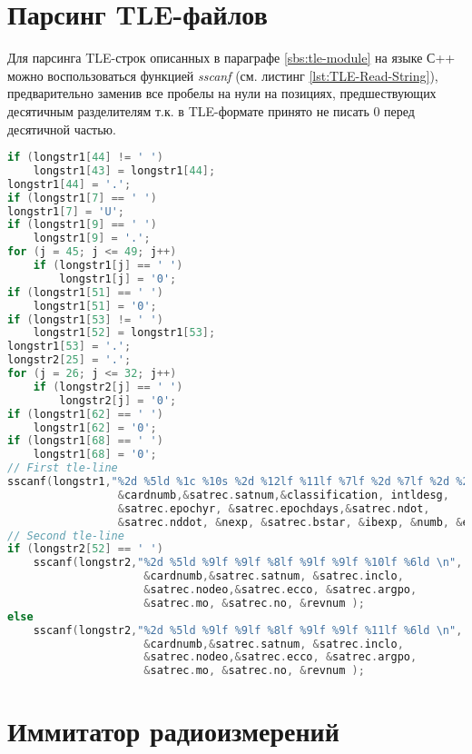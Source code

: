 \section{Парсинг TLE-файлов}

Для парсинга TLE-строк описанных в параграфе \ref{sbs:tle-module} на языке С++ можно воспользоваться функцией 
\textit{sscanf} (см. листинг \ref{lst:TLE-Read-String}), предварительно заменив все пробелы на нули на позициях,
предшествующих десятичным разделителям т.к. в TLE-формате принято не писать 0 перед десятичной частью.
\begin{lstlisting}[language=C++, basicstyle=\fontsize{10}{9}\ttfamily,
	caption={Чтение TLE строк},label={lst:TLE-Read-String}]
if (longstr1[44] != ' ')
	longstr1[43] = longstr1[44];
longstr1[44] = '.';
if (longstr1[7] == ' ')
longstr1[7] = 'U';
if (longstr1[9] == ' ')
	longstr1[9] = '.';
for (j = 45; j <= 49; j++)
	if (longstr1[j] == ' ')
		longstr1[j] = '0';
if (longstr1[51] == ' ')
	longstr1[51] = '0';
if (longstr1[53] != ' ')
	longstr1[52] = longstr1[53];
longstr1[53] = '.';
longstr2[25] = '.';
for (j = 26; j <= 32; j++)
	if (longstr2[j] == ' ')
		longstr2[j] = '0';
if (longstr1[62] == ' ')
	longstr1[62] = '0';
if (longstr1[68] == ' ')
	longstr1[68] = '0';
// First tle-line
sscanf(longstr1,"%2d %5ld %1c %10s %2d %12lf %11lf %7lf %2d %7lf %2d %2d %6ld ",
                 &cardnumb,&satrec.satnum,&classification, intldesg, 
                 &satrec.epochyr, &satrec.epochdays,&satrec.ndot, 
                 &satrec.nddot, &nexp, &satrec.bstar, &ibexp, &numb, &elnum );
// Second tle-line
if (longstr2[52] == ' ')
	sscanf(longstr2,"%2d %5ld %9lf %9lf %8lf %9lf %9lf %10lf %6ld \n",
                     &cardnumb,&satrec.satnum, &satrec.inclo,
                     &satrec.nodeo,&satrec.ecco, &satrec.argpo, 
                     &satrec.mo, &satrec.no, &revnum );
else
	sscanf(longstr2,"%2d %5ld %9lf %9lf %8lf %9lf %9lf %11lf %6ld \n",
                     &cardnumb,&satrec.satnum, &satrec.inclo,
                     &satrec.nodeo,&satrec.ecco, &satrec.argpo, 
                     &satrec.mo, &satrec.no, &revnum );
\end{lstlisting}


\section{Иммитатор радиоизмерений}

